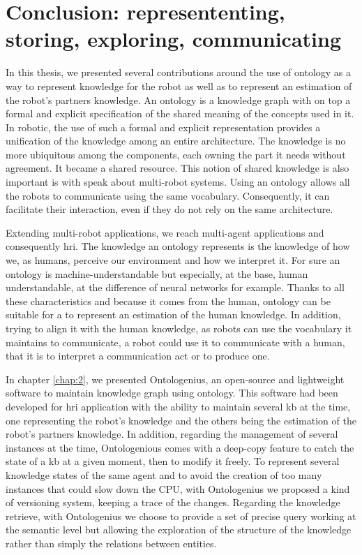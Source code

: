 
\chapter*{Conclusion: represententing, storing, exploring, communicating}

%
%
%

In this thesis, we presented several contributions around the use of ontology as a way to represent knowledge for the robot as well as to represent an estimation of the robot's partners knowledge. An ontology is a knowledge graph with on top a formal and explicit specification of the shared meaning of the concepts used in it. In robotic, the use of such a formal and explicit representation provides a unification of the knowledge among an entire architecture. The knowledge is no more ubiquitous among the components, each owning the part it needs without agreement. It became a shared resource. This notion of shared knowledge is also important is with speak about multi-robot systems. Using an ontology allows all the robots to communicate using the same vocabulary. Consequently, it can facilitate their interaction, even if they do not rely on the same architecture.

Extending multi-robot applications, we reach multi-agent applications and consequently \acrfull{hri}. The knowledge an ontology represents is the knowledge of how we, as humans, perceive our environment and how we interpret it. For sure an ontology is machine-understandable but especially, at the base, human understandable, at the difference of neural networks for example. Thanks to all these characteristics and because it comes from the human, ontology can be suitable for a to represent an estimation of the human knowledge. In addition, trying to align it with the human knowledge, as robots can use the vocabulary it maintains to communicate, a robot could use it to communicate with a human, that it is to interpret a communication act or to produce one.

In chapter \ref{chap:2}, we presented Ontologenius, an open-source and lightweight software to maintain knowledge graph using ontology. This software had been developed for \acrshort{hri} application with the ability to maintain several \acrlong{kb} at the time, one representing the robot's knowledge and the others being the estimation of the robot's partners knowledge. In addition, regarding the management of several instances at the time, Ontologenious comes with a deep-copy feature to catch the state of a \acrshort{kb} at a given moment, then to modify it freely. To represent several knowledge states of the same agent and to avoid the creation of too many instances that could slow down the CPU, with Ontologenius we proposed a kind of versioning system, keeping a trace of the changes. Regarding the knowledge retrieve, with Ontologenius we choose to provide a set of precise query working at the semantic level but allowing the exploration of the structure of the knowledge rather than simply the relations between entities.

